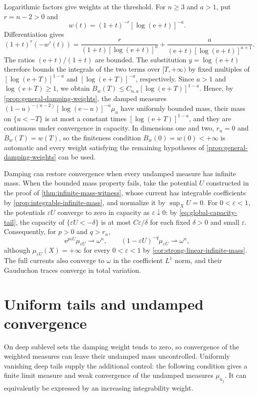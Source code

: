 Logarithmic factors give weights at the threshold. For $n\geq3$ and $a>1$, put $r=n-2>0$ and
\[
 w(t)=(1+t)^{-r}[\log(\mathrm{e}+t)]^{-a}.
\]
Differentiation gives
\[
 (1+t)^r(-w'(t))
 =\frac{r}{(1+t)[\log(\mathrm{e}+t)]^a}
  +\frac{a}{(\mathrm{e}+t)[\log(\mathrm{e}+t)]^{a+1}}.
\]
The ratios $(\mathrm{e}+t)/(1+t)$ are bounded. The substitution $y=\log(\mathrm{e}+t)$ therefore bounds the integrals of the two terms over $[T,+\infty)$ by fixed multiples of $[\log(\mathrm{e}+T)]^{1-a}$ and $[\log(\mathrm{e}+T)]^{-a}$, respectively. Since $a>1$ and $\log(\mathrm{e}+T)\geq1$, we obtain
$B_w(T)\leq C_{n,a}[\log(\mathrm{e}+T)]^{1-a}$. Hence, by \cref{prop:general-damping-weights}, the damped measures $(1-u)^{-(n-2)}[\log(\mathrm{e}-u)]^{-a}\mu_u$ have uniformly bounded mass, their mass on $\{u<-T\}$ is at most a constant times $[\log(\mathrm{e}+T)]^{1-a}$, and they are continuous under convergence in capacity. In dimensions one and two, $r_n=0$ and $B_w(T)=w(T)$, so the finiteness condition $B_w(0)=w(0)<+\infty$ is automatic and every weight satisfying the remaining hypotheses of \cref{prop:general-damping-weights} can be used.

Damping can restore convergence when every undamped measure has infinite mass. When the bounded mass property fails, take the potential $U$ constructed in the proof of \cref{thm:infinite-mass-witness}, whose current has integrable coefficients by \cref{prop:integrable-infinite-mass}, and normalize it by $\sup_XU=0$. For $0<\varepsilon<1$, the potentials $\varepsilon U$ converge to zero in capacity as $\varepsilon\downarrow0$: by \eqref{eq:global-capacity-tail}, the capacity of $\{\varepsilon U<-\delta\}$ is at most $C\varepsilon/\delta$ for each fixed $\delta>0$ and small $\varepsilon$. Consequently, for $p>0$ and $q>r_n$,
\[
 \mathrm{e}^{p\varepsilon U}\mu_{\varepsilon U}\rightharpoonup\omega^n,
 \qquad
 (1-\varepsilon U)^{-q}\mu_{\varepsilon U}\rightharpoonup\omega^n,
\]
although $\mu_{\varepsilon U}(X)=+\infty$ for every $0<\varepsilon<1$ by \cref{cor:strong-linear-infinite-mass}. The full currents also converge to $\omega$ in the coefficient $L^1$ norm, and their Gauduchon traces converge in total variation.

\section{Uniform tails and undamped convergence}

On deep sublevel sets the damping weight tends to zero, so convergence of the weighted measures can leave their undamped mass uncontrolled. Uniformly vanishing deep tails supply the additional control: the following condition gives a finite limit measure and weak convergence of the undamped measures $\mu_{u_j}$. It can equivalently be expressed by an increasing integrability weight.

